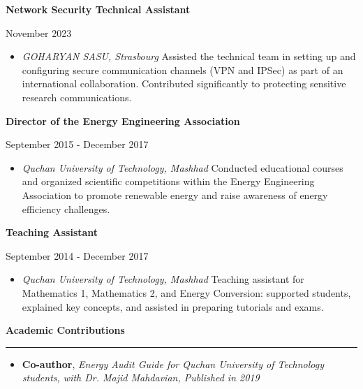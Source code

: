 \documentclass[a4paper]{letter}
\newcommand{\divider}{\rule{\linewidth}{0.9pt}}
\begin{document}
\begin{minipage}[t]{0.67\textwidth}
\vspace{3mm}
{\textbf{Network Security Technical Assistant}}

{\footnotesize November 2023}
\begin{itemize}
   \footnotesize \item \textit{GOHARYAN SASU, Strasbourg}
   \newline
   Assisted the technical team in setting up and configuring secure communication channels (VPN and IPSec) as part of an international collaboration. Contributed significantly to protecting sensitive research communications.
\end{itemize}

\vspace{3mm}
{\textbf{Director of the Energy Engineering Association}}

{\footnotesize September 2015 - December 2017}
\begin{itemize}
   \footnotesize \item \textit{Quchan University of Technology, Mashhad}
   \newline
   Conducted educational courses and organized scientific competitions within the Energy Engineering Association to promote renewable energy and raise awareness of energy efficiency challenges.
\end{itemize}

\vspace{3mm}

{\textbf{Teaching Assistant}}

{\footnotesize September 2014 - December 2017}
\begin{itemize}
    \footnotesize \item \textit{Quchan University of Technology, Mashhad}
    \newline
    Teaching assistant for Mathematics 1, Mathematics 2, and Energy Conversion: supported students, explained key concepts, and assisted in preparing tutorials and exams.
\end{itemize}

\vspace{3mm}


{\large \textbf{Academic Contributions}}
\divider
\vspace{3mm}
\begin{itemize}
    \footnotesize \item {\textbf{Co-author}, \textit{Energy Audit Guide for Quchan University of Technology students, with Dr. Majid Mahdavian, Published in 2019}}



\end{itemize}



\end{minipage}
\end{document}
